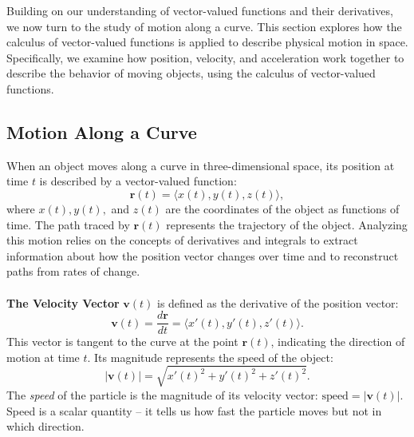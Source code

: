 \newpage









\noindent Building on our understanding of vector-valued functions and their derivatives, we now turn to the study of motion along a curve. This section explores how the calculus of vector-valued functions is applied to describe physical motion in space. Specifically, we examine how position, velocity, and acceleration work together to describe the behavior of moving objects, using the calculus of vector-valued functions.

\subsection*{Motion Along a Curve} 

\noindent When an object moves along a curve in three-dimensional space, its position at time \( t \) is described by a vector-valued function:
\[
\mathbf{r}(t) = \langle x(t), y(t), z(t) \rangle,
\]
where \( x(t), y(t), \) and \( z(t) \) are the coordinates of the object as functions of time. The path traced by \( \mathbf{r}(t) \) represents the trajectory of the object. Analyzing this motion relies on the concepts of derivatives and integrals to extract information about how the position vector changes over time and to reconstruct paths from rates of change. \\ \\  \textbf{The Velocity Vector} \( \mathbf{v}(t) \) is defined as the derivative of the position vector:
\[
\mathbf{v}(t) = \frac{d\mathbf{r}}{dt} = \langle x'(t), y'(t), z'(t) \rangle.
\]
This vector is tangent to the curve at the point \( \mathbf{r}(t) \), indicating the direction of motion at time \( t \). Its magnitude represents the speed of the object:
\[
|\mathbf{v}(t)| = \sqrt{x'(t)^2 + y'(t)^2 + z'(t)^2}.
\]
The \textit{speed} of the particle is the magnitude of its velocity vector: \( \text{speed} = |\mathbf{v}(t)| \). Speed is a scalar quantity -- it tells us how fast the particle moves but not in which direction.

